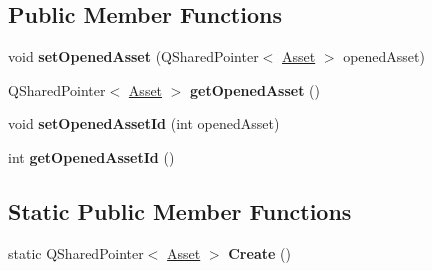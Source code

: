 \subsection*{Public Member Functions}
\begin{DoxyCompactItemize}
\item 
\hypertarget{class_picto_1_1_state_machine_editor_data_ab56cf9a470bfdc851d366b12cf7499c3}{void {\bfseries set\-Opened\-Asset} (Q\-Shared\-Pointer$<$ \hyperlink{class_picto_1_1_asset}{Asset} $>$ opened\-Asset)}\label{class_picto_1_1_state_machine_editor_data_ab56cf9a470bfdc851d366b12cf7499c3}

\item 
\hypertarget{class_picto_1_1_state_machine_editor_data_a2d8ef782add4139f198549efc650ab01}{Q\-Shared\-Pointer$<$ \hyperlink{class_picto_1_1_asset}{Asset} $>$ {\bfseries get\-Opened\-Asset} ()}\label{class_picto_1_1_state_machine_editor_data_a2d8ef782add4139f198549efc650ab01}

\item 
\hypertarget{class_picto_1_1_state_machine_editor_data_afdae8d01ecf2eec6b265cece9b656d52}{void {\bfseries set\-Opened\-Asset\-Id} (int opened\-Asset)}\label{class_picto_1_1_state_machine_editor_data_afdae8d01ecf2eec6b265cece9b656d52}

\item 
\hypertarget{class_picto_1_1_state_machine_editor_data_a1ceaef18baa7529b1a644c3dcc53d3d4}{int {\bfseries get\-Opened\-Asset\-Id} ()}\label{class_picto_1_1_state_machine_editor_data_a1ceaef18baa7529b1a644c3dcc53d3d4}

\end{DoxyCompactItemize}
\subsection*{Static Public Member Functions}
\begin{DoxyCompactItemize}
\item 
\hypertarget{class_picto_1_1_state_machine_editor_data_a8a9e0539aa39876154e735eb8879d1d5}{static Q\-Shared\-Pointer$<$ \hyperlink{class_picto_1_1_asset}{Asset} $>$ {\bfseries Create} ()}\label{class_picto_1_1_state_machine_editor_data_a8a9e0539aa39876154e735eb8879d1d5}

\end{DoxyCompactItemize}
